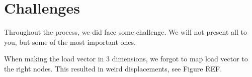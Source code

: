 \section{Challenges}

Throughout the process, we did face some challenge. We will not present all to you, but some of the most important ones. 

When making the load vector in 3 dimensions, we forgot to map load vector to the right nodes. This resulted in weird displacements, see Figure REF. 





